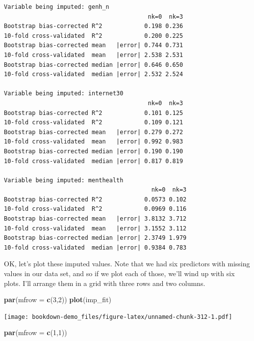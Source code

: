 \documentclass[]{book}
\newenvironment{Shaded}{\begin{snugshade}}{\end{snugshade}}
\newcommand{\KeywordTok}[1]{\textcolor[rgb]{0.13,0.29,0.53}{\textbf{#1}}}
\newcommand{\DataTypeTok}[1]{\textcolor[rgb]{0.13,0.29,0.53}{#1}}
\newcommand{\DecValTok}[1]{\textcolor[rgb]{0.00,0.00,0.81}{#1}}
\newcommand{\NormalTok}[1]{#1}
\theoremstyle{definition}
\theoremstyle{definition}
\theoremstyle{definition}
\theoremstyle{remark}
\begin{document}
\begin{verbatim}
Variable being imputed: genh_n 
                                         nk=0  nk=3
Bootstrap bias-corrected R^2            0.198 0.236
10-fold cross-validated  R^2            0.200 0.225
Bootstrap bias-corrected mean   |error| 0.744 0.731
10-fold cross-validated  mean   |error| 2.538 2.531
Bootstrap bias-corrected median |error| 0.646 0.650
10-fold cross-validated  median |error| 2.532 2.524

Variable being imputed: internet30 
                                         nk=0  nk=3
Bootstrap bias-corrected R^2            0.101 0.125
10-fold cross-validated  R^2            0.109 0.121
Bootstrap bias-corrected mean   |error| 0.279 0.272
10-fold cross-validated  mean   |error| 0.992 0.983
Bootstrap bias-corrected median |error| 0.190 0.190
10-fold cross-validated  median |error| 0.817 0.819

Variable being imputed: menthealth 
                                          nk=0  nk=3
Bootstrap bias-corrected R^2            0.0573 0.102
10-fold cross-validated  R^2            0.0969 0.116
Bootstrap bias-corrected mean   |error| 3.8132 3.712
10-fold cross-validated  mean   |error| 3.1552 3.112
Bootstrap bias-corrected median |error| 2.3749 1.979
10-fold cross-validated  median |error| 0.9384 0.783
\end{verbatim}

OK, let's plot these imputed values. Note that we had six predictors
with missing values in our data set, and so if we plot each of those,
we'll wind up with six plots. I'll arrange them in a grid with three
rows and two columns.

\begin{Shaded}
\begin{Highlighting}[]
\KeywordTok{par}\NormalTok{(}\DataTypeTok{mfrow =} \KeywordTok{c}\NormalTok{(}\DecValTok{3}\NormalTok{,}\DecValTok{2}\NormalTok{))}
\KeywordTok{plot}\NormalTok{(imp_fit)}
\end{Highlighting}
\end{Shaded}

\texttt{[image: bookdown-demo\_files/figure-latex/unnamed-chunk-312-1.pdf]}

\begin{Shaded}
\begin{Highlighting}[]
\KeywordTok{par}\NormalTok{(}\DataTypeTok{mfrow =} \KeywordTok{c}\NormalTok{(}\DecValTok{1}\NormalTok{,}\DecValTok{1}\NormalTok{))}
\end{Highlighting}
\end{Shaded}
\end{document}
